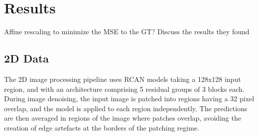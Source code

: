 \documentclass[12pt]{article}
\begin{document}
\section{Results}

Affine rescaling to minimize the MSE to the GT?
Discuss the results they found

\subsection{2D Data}

The 2D image processing pipeline uses RCAN models taking a 128x128 input region,
and with an architecture comprising 5 residual groups of 3 blocks each.
During image denoising, the input image is patched into regions having a 32 pixel overlap,
and the model is applied to each region independently.
The predictions are then averaged in regions of the image where patches overlap,
avoiding the creation of edge artefacts at the borders of the patching regime.
\end{document}
